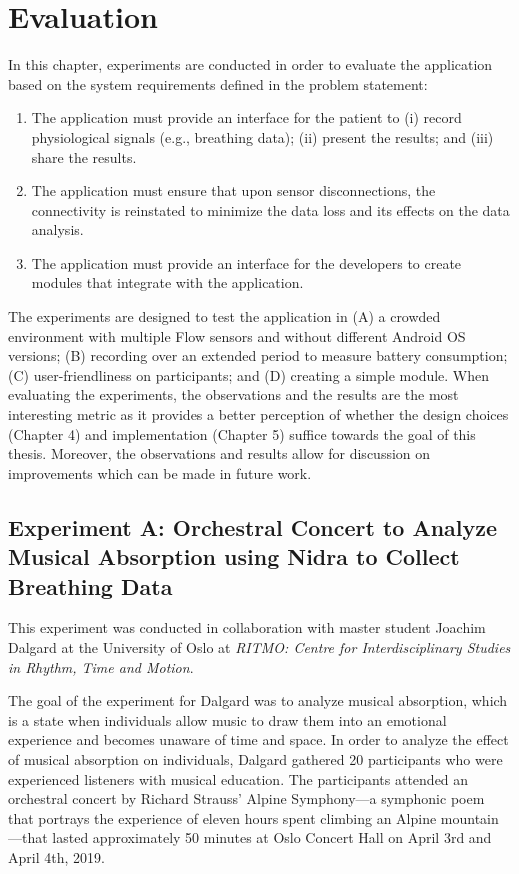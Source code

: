 \chapter{Evaluation}

In this chapter, experiments are conducted in order to evaluate the application based on the system requirements defined in the problem statement: 

\begin{enumerate}
    \item The application must provide an interface for the patient to (i) record physiological signals (e.g., breathing data); (ii) present the results; and (iii) share the results.
    \item The application must ensure that upon sensor disconnections, the connectivity is reinstated to minimize the data loss and its effects on the data analysis.
    \item The application must provide an interface for the developers to create modules that integrate with the application.
\end{enumerate}

The experiments are designed to test the application in (A) a crowded environment with multiple Flow sensors and without different Android OS versions; (B) recording over an extended period to measure battery consumption; (C) user-friendliness on participants; and (D) creating a simple module. When evaluating the experiments, the observations and the results are the most interesting metric as it provides a better perception of whether the design choices (Chapter 4) and implementation (Chapter 5) suffice towards the goal of this thesis. Moreover, the observations and results allow for discussion on improvements which can be made in future work.  

\newpage
\section{Experiment A: Orchestral Concert to Analyze Musical Absorption using Nidra to Collect Breathing Data}
This experiment was conducted in collaboration with master student Joachim Dalgard at the University of Oslo at \textit{RITMO: Centre for Interdisciplinary Studies in Rhythm, Time and Motion}. 

The goal of the experiment for Dalgard was to analyze musical absorption, which is a state when individuals allow music to draw them into an emotional experience and becomes unaware of time and space. In order to analyze the effect of musical absorption on individuals, Dalgard gathered 20 participants who were experienced listeners with musical education. The participants attended an orchestral concert by Richard Strauss' Alpine Symphony---a symphonic poem that portrays the experience of eleven hours spent climbing an Alpine mountain---that lasted approximately 50 minutes at Oslo Concert Hall on April 3rd and April 4th, 2019.  

